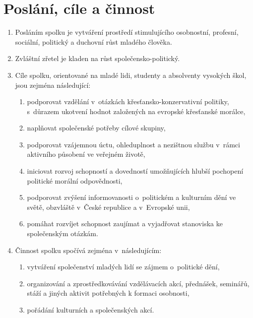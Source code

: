 \documentclass[a4paper]{article}
\begin{document}
\section{Poslání, cíle a činnost}
    \begin{enumerate}
    \item Posláním spolku je vytváření prostředí stimulujícího osobnostní,
        profesní, sociální, politický a duchovní růst mladého člověka.

    \item Zvláštní zřetel je kladen na růst společensko-politický.

    \item Cíle spolku, orientované na mladé lidi, studenty a absolventy
        vysokých škol, jsou zejména následující:
        \begin{enumerate}
        \item podporovat vzdělání v~otázkách křesťansko-konzervativní
            politiky, s~důrazem ukotvení hodnot založených na evropské
            křesťanské morálce,

        \item naplňovat společenské potřeby cílové skupiny,

        \item podporovat vzájemnou úctu, ohleduplnost a nezištnou službu
            v~rámci aktivního působení ve veřejném životě,

        \item iniciovat rozvoj schopností a dovedností umožňujících hlubší
            pochopení politické morální odpovědnosti,

        \item podporovat zvýšení informovanosti o~politickém a kulturním
            dění ve světě, obzvláště v~České republice a v~Evropské unii,

        \item pomáhat rozvíjet schopnost zaujímat a vyjadřovat stanoviska
            ke společenským otázkám.
        \end{enumerate}

    \item Činnost spolku spočívá zejména v~následujícím:
        \begin{enumerate}
        \item vytváření společenství mladých lidí se zájmem o~politické dění,

        \item organizování a zprostředkovávání vzdělávacích akcí, přednášek,
            seminářů, stáží a jiných aktivit potřebných k formaci osobnosti,

        \item pořádání kulturních a společenských akcí.
        \end{enumerate}
    \end{enumerate}
\end{document}
